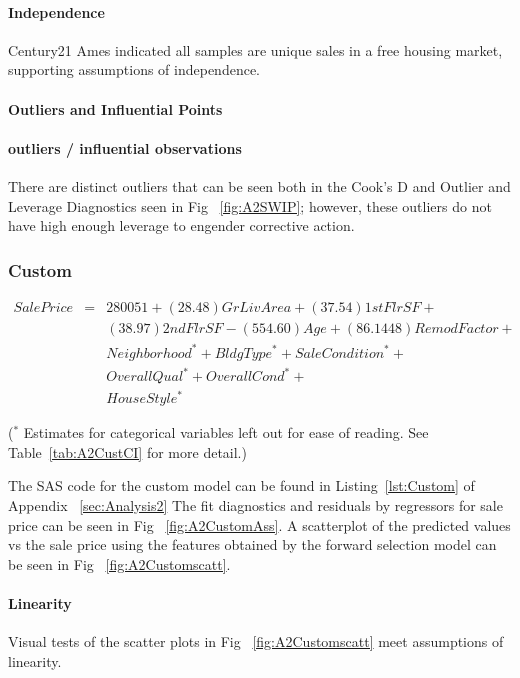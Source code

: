 \documentclass[11pt]{scrartcl} %
\begin{document}
\paragraph{Independence} Century21 Ames indicated all samples are unique sales in a free housing market, supporting assumptions of independence. 
\paragraph{Outliers and Influential Points}
\paragraph{outliers / influential observations} There are distinct outliers that can be seen both in the Cook's D and Outlier and Leverage Diagnostics seen in Fig ~\ref{fig:A2SWIP}; however, these outliers do not have high enough leverage to engender corrective action.

\subsubsection{Custom}
\begin{eqnarray*}
SalePrice &=& 280051 + (28.48)GrLivArea + (37.54)1stFlrSF + \\
& &                   (38.97)2ndFlrSF - (554.60)Age + (86.1448)RemodFactor +\\
& &	                Neighborhood^* + BldgType^* + SaleCondition ^*+\\
& &                   OverallQual^* + OverallCond^* + \\
& &                   HouseStyle^*
\end{eqnarray*}
\begin{center}
\small{ ($^*$ Estimates for categorical variables left out for ease of reading. See Table~\ref{tab:A2CustCI} for more detail.)}\\
\end{center}
The SAS code for the custom model can be found in Listing~\ref{lst:Custom} of Appendix ~\ref{sec:Analysis2}
The fit diagnostics and residuals by regressors for sale price can be seen in Fig ~\ref{fig:A2CustomAss}. A scatterplot of the predicted values vs the sale price using the features obtained by the forward selection model can be seen in Fig ~\ref{fig:A2Customscatt}.
\paragraph{Linearity} Visual tests of the scatter plots in Fig ~\ref{fig:A2Customscatt} meet assumptions of linearity.
\end{document}
